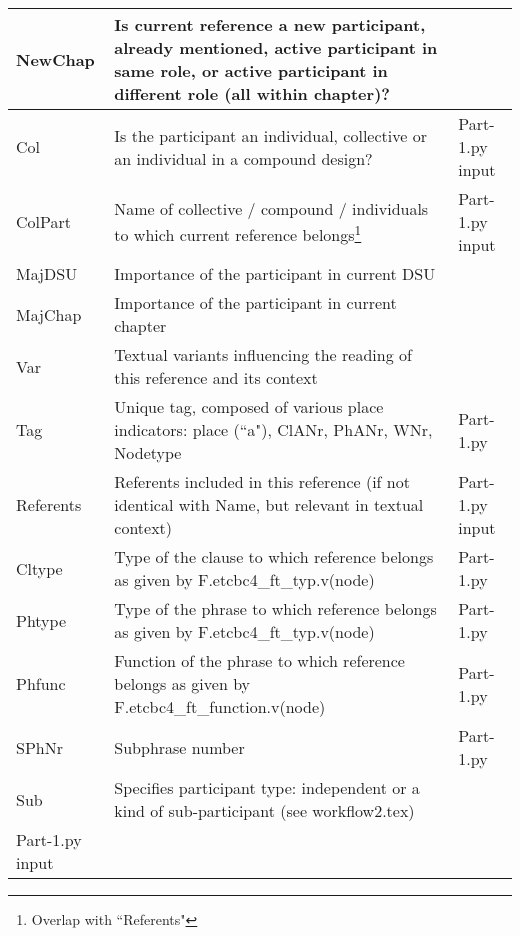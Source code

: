 \documentclass{article}
\begin{document}
\begin{longtable}{|l|p{}|l|}
NewChap & Is current reference a new participant, already mentioned, active participant in same role, or active participant in different role (all within chapter)?  & \\ \hline
Col & Is the participant an individual, collective or an individual in a compound design? & Part-1.py input \\ \hline
ColPart & Name of collective / compound / individuals to which current reference belongs\footnote{Overlap with ``Referents"} & Part-1.py input \\ \hline
MajDSU & Importance of the participant in current DSU & \\ \hline
MajChap & Importance of the participant in current chapter & \\ \hline
Var & Textual variants influencing the reading of this reference and its context & \\ \hline
Tag & Unique tag, composed of various place indicators: place (``a"), ClANr, PhANr, WNr, Nodetype & Part-1.py \\ \hline
Referents & Referents included in this reference (if not identical with Name, but relevant in textual context) & Part-1.py input \\ \hline
Cltype & Type of the clause to which reference belongs as given by F.etcbc4\_ft\_typ.v(node) & Part-1.py \\ \hline
Phtype & Type of the phrase to which reference belongs as given by F.etcbc4\_ft\_typ.v(node) & Part-1.py \\ \hline
Phfunc & Function of the phrase to which reference belongs as given by F.etcbc4\_ft\_function.v(node) & Part-1.py \\ \hline
SPhNr & Subphrase number & Part-1.py \\ \hline
Sub & Specifies participant type: independent or a kind of sub-participant (see workflow2.tex) \\ Part-1.py input \hline

\\ \hline


\end{longtable}
\end{document}
